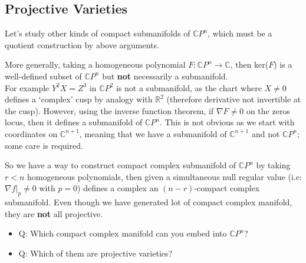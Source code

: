 \subsection{Projective Varieties} %
\label{sub:projective_varieties}
Let's study other kinds of compact submanifolds of $\mathbb{C}P^n$, which must be a quotient construction by above arguments.
% 
    
More generally, taking a homogeneous polynomial $F: \mathbb{C}P^n \rightarrow \mathbb{C}$, then ker($F$) is a well-defined subset of $\mathbb{C}P^n$ but \textbf{not} necessarily a submanifold.\\
For example $Y^2X = Z^3$ in $\mathbb{C}P^2$ is not a submanifold, as the chart where $X \neq 0$ defines a `complex' cusp by analogy with $\mathbb{R}^2$ (therefore derivative not invertible at the cusp).
However, using the inverse function theorem, if $\nabla F \neq 0$ on the zeros locus, then it defines a submanifold of $\mathbb{C}P^n$. 
This is not obvious as we start with coordinates on $\mathbb{C}^{n+1}$, meaning that we have a submanifold of $\mathbb{C}^{n+1}$ and not $\mathbb{C}P^n$; some care is required.
% 

% 
So we have a way to construct compact complex submanifold of $\mathbb{C}P^n$ by taking $r < n$ homogeneous polynomials, then given a simultaneous null regular value (i.e: $\nabla f|_p \neq 0$ with $p=0$) defines a complex an $(n-r)$-compact complex submanifold.
Even though we have generated lot of compact complex manifold, they are \textbf{not} all projective.
\begin{itemize}
    \item Q: Which compact complex manifold can you embed into $\mathbb{C}P^n$?
    \item Q: Which of them are projective varieties?
\end{itemize}


